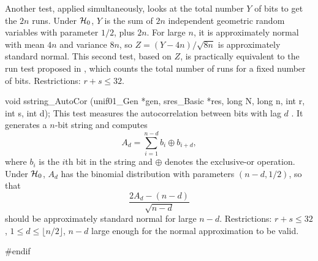  Another test, applied simultaneously, looks at the total number
  $Y$ of bits to get the $2n$ runs.  Under $\cH_0$, $Y$ is the sum of
  $2n$ independent geometric random variables with parameter $1/2$,
  plus $2n$.  For large $n$, it is approximately normal with mean
  $4n$ and variance $8n$, so $Z = (Y - 4n)/\sqrt{8n}$ is approximately
  standard normal.  This second test, based on $Z$, is practically
  equivalent to the run test proposed in \cite{rRUK01a}, which counts
  the total number of runs for a fixed number of bits.
  Restrictions: $r + s \le 32$.
\endtab
\iffalse  %
 \tab  This test, taken from \cite{rRUK01a}, considers whether the runs of
  0's and 1's in a sequence of bits is as expected for a random sequence.
 \index{Test!Run!bits}%
  A run of length $\ell$ is an uninterrupted sequence of
  $\ell$ identical bits, preceded and followed by a bit of opposite value.
  The test decomposes a sequence of $n$ bits into runs of identical bits
  and counts the total number of runs $R$.

  Under $\cH_0$, the standardized test statistic
$$
  Z = \frac{R - 2nf_1(1 - f_1)}{2\sqrt n f_1(1 - f_1)},
$$
 where $f_1$ is the proportion of 1's amongst the $n$ bits,
 has the standard normal distribution in the limit as $n\to\infty$
 (see \cite{rRUK01a} for a reference).
 The test compares the value of $Z$ to the standard normal.
 Restrictions: $r + s \le 32$.
 Recommendation: $100 \le n$.
\endtab
\fi  %
\code


void sstring_AutoCor (unif01_Gen *gen, sres_Basic *res,
                      long N, long n, int r, int s, int d);
\endcode
 \tab
 This test measures the autocorrelation between bits with lag $d$ \cite{rERD92a}.
 It generates a $n$-bit string and computes
$$
  A_d = \sum_{i=1}^{n-d} b_i \oplus b_{i+d},
$$
  where $b_i$ is the $i$th bit in the string and
  $\oplus$ denotes the exclusive-or operation.
  Under $\cH_0$, $A_d$ has the binomial distribution
  with parameters $(n-d, 1/2)$, so that
$$
  \frac{2 A_d - (n-d)}{\sqrt{n-d}}
$$
  should be approximately standard normal for large $n-d$.
  Restrictions: $r + s \le 32$, $1 \le d \le \lfloor n/2 \rfloor$, $n-d$
  large enough for the normal approximation to be valid.
 \endtab
\code

\hide
#endif
\endhide
\endcode
